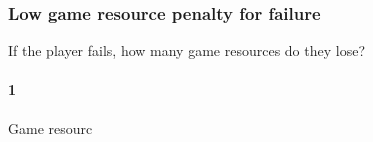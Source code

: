 \subsubsection{Low game resource penalty for failure}If the player fails, how many game resources do they lose?\paragraph{1}Game resourc